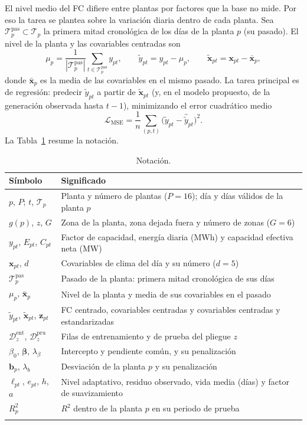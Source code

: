 \documentclass[pdflatex,sn-mathphys-num]{sn-jnl}
\begin{document}
El nivel medio del FC difiere entre plantas por factores que la base no mide. Por eso la tarea se plantea sobre la variación diaria dentro de cada planta. Sea $\mathcal{T}^{\text{pas}}_p \subset \mathcal{T}_p$ la primera mitad cronológica de los días de la planta $p$ (su pasado). El nivel de la planta y las covariables centradas son
\begin{equation}
\mu_p = \frac{1}{|\mathcal{T}^{\text{pas}}_p|}\sum_{t \in \mathcal{T}^{\text{pas}}_p} y_{pt}, \qquad
\tilde{y}_{pt} = y_{pt} - \mu_p, \qquad
\tilde{\mathbf{x}}_{pt} = \mathbf{x}_{pt} - \bar{\mathbf{x}}_p,
\label{eq:centrado}
\end{equation}
donde $\bar{\mathbf{x}}_p$ es la media de las covariables en el mismo pasado. La tarea principal es de regresión: predecir $\tilde{y}_{pt}$ a partir de $\tilde{\mathbf{x}}_{pt}$ (y, en el modelo propuesto, de la generación observada hasta $t-1$), minimizando el error cuadrático medio
\begin{equation}
\mathcal{L}_{\text{MSE}} = \frac{1}{n}\sum_{(p,t)} \bigl(\tilde{y}_{pt} - \hat{\tilde{y}}_{pt}\bigr)^2 .
\label{eq:mse}
\end{equation}
La Tabla~\ref{tab:notacion} resume la notación.

\begin{table}[t]
\caption{Notación.}
\label{tab:notacion}
\centering
\footnotesize
\begin{tabular}{@{}ll@{}}
\toprule
Símbolo & Significado\\
\midrule
$p$, $P$; $t$, $\mathcal{T}_p$ & Planta y número de plantas ($P=16$); día y días válidos de la planta $p$\\
$g(p)$, $z$, $G$ & Zona de la planta, zona dejada fuera y número de zonas ($G=6$)\\
$y_{pt}$, $E_{pt}$, $C_{pt}$ & Factor de capacidad, energía diaria (MWh) y capacidad efectiva neta (MW)\\
$\mathbf{x}_{pt}$, $d$ & Covariables de clima del día y su número ($d=5$)\\
$\mathcal{T}^{\text{pas}}_p$ & Pasado de la planta: primera mitad cronológica de sus días\\
$\mu_p$, $\bar{\mathbf{x}}_p$ & Nivel de la planta y media de sus covariables en el pasado\\
$\tilde{y}_{pt}$, $\tilde{\mathbf{x}}_{pt}$, $\mathbf{z}_{pt}$ & FC centrado, covariables centradas y covariables centradas y estandarizadas\\
$\mathcal{D}^{\text{ent}}_z$, $\mathcal{D}^{\text{pru}}_z$ & Filas de entrenamiento y de prueba del pliegue $z$\\
$\beta_0$, $\boldsymbol{\beta}$, $\lambda_\beta$ & Intercepto y pendiente común, y su penalización\\
$\mathbf{b}_p$, $\lambda_b$ & Desviación de la planta $p$ y su penalización\\
$\ell_{pt}$, $e_{pt}$, $h$, $a$ & Nivel adaptativo, residuo observado, vida media (días) y factor de suavizamiento\\
$R^2_p$ & $R^2$ dentro de la planta $p$ en su periodo de prueba\\
\botrule
\end{tabular}
\end{table}
\end{document}
